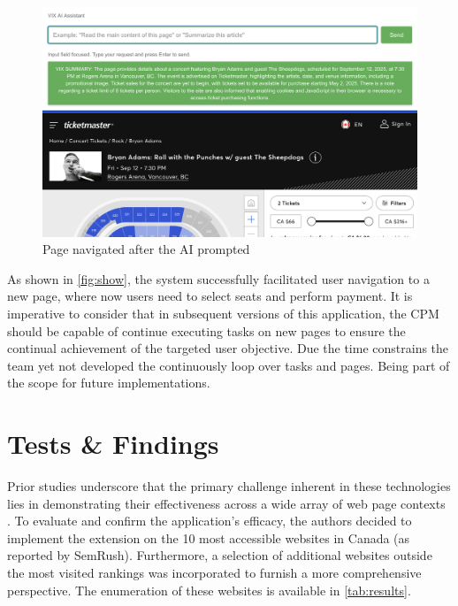 \documentclass[conference]{IEEEtran}
\begin{document}
\begin{figure}[h]
\centering
\includegraphics[width=\columnwidth]{images/4.png}
\caption{Page navigated after the AI prompted}
\label{fig:show}
\end{figure}

As shown in \autoref{fig:show}, the system successfully facilitated user navigation to a new page, where now users need to select seats and perform payment. It is imperative to consider that in subsequent versions of this application, the CPM should be capable of continue executing tasks on new pages to ensure the continual achievement of the targeted user objective. Due the time constrains the team yet not developed the continuously loop over tasks and pages. Being part of the scope for future implementations.


\section{Tests \& Findings}\label{test}

Prior studies underscore that the primary challenge inherent in these technologies lies in demonstrating their effectiveness across a wide array of web page contexts \cite{prakash2024, he2024webvoyager}. To evaluate and confirm the application's efficacy, the authors decided to implement the extension on the 10 most accessible websites in Canada (as reported by SemRush).\cite{semrumsh} Furthermore, a selection of additional websites outside the most visited rankings was incorporated to furnish a more comprehensive perspective. The enumeration of these websites is available in \autoref{tab:results}.
\end{document}
